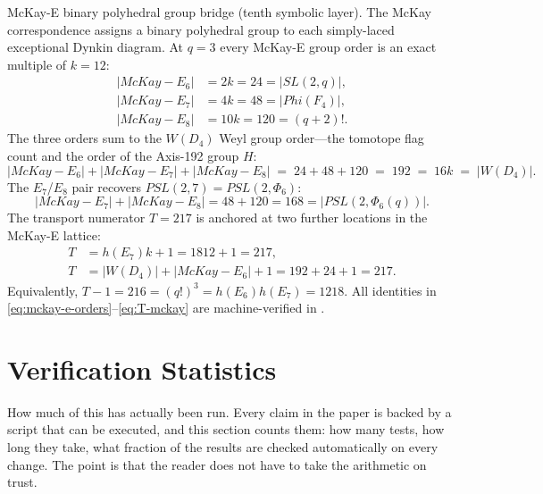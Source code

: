 \documentclass[12pt,a4paper]{article}
\def\mathrm#1{#1}%
\def\textbf#1{#1}%
\def\text#1{#1}%
\def\Phi#1{Phi#1}%
\def\cdot{ }%
\theoremstyle{definition}
\begin{document}
\medskip
\noindent\textbf{McKay-E binary polyhedral group bridge (tenth symbolic layer).}\quad
The McKay correspondence assigns a binary polyhedral group to each simply-laced
exceptional Dynkin diagram.  At $q=3$ every McKay-E group order is an exact
multiple of $k=12$:
\begin{equation}
\begin{aligned}
|\text{McKay-}E_6| &= 2k = 24 = |SL(2,q)|,\\
|\text{McKay-}E_7| &= 4k = 48 = |\Phi(F_4)|,\\
|\text{McKay-}E_8| &= 10k = 120 = (q{+}2)!.
\end{aligned}
\label{eq:mckay-e-orders}
\end{equation}
The three orders sum to the $W(D_4)$ Weyl group order---the tomotope flag
count and the order of the Axis-192 group $H$:
\begin{equation}
|\text{McKay-}E_6|+|\text{McKay-}E_7|+|\text{McKay-}E_8|
  \;=\; 24+48+120 \;=\; 192 \;=\; 16k \;=\; |W(D_4)|.
\label{eq:mckay-e-sum}
\end{equation}
The $E_7$/$E_8$ pair recovers $\mathrm{PSL}(2,7) = \mathrm{PSL}(2,\Phi_6)$:
\begin{equation}
|\text{McKay-}E_7|+|\text{McKay-}E_8| = 48+120 = 168 = |\mathrm{PSL}(2,\Phi_6(q))|.
\label{eq:mckay-psl}
\end{equation}
The transport numerator $T=217$ is anchored at two further locations in the
McKay-E lattice:
\begin{equation}
\begin{aligned}
T &= h(E_7)\cdot k + 1 = 18\cdot 12 + 1 = 217,\\
T &= |W(D_4)| + |\text{McKay-}E_6| + 1 = 192+24+1 = 217.
\end{aligned}
\label{eq:T-mckay}
\end{equation}
Equivalently, $T-1 = 216 = (q!)^3 = h(E_6)\cdot h(E_7) = 12\cdot 18$.
All identities in \eqref{eq:mckay-e-orders}--\eqref{eq:T-mckay} are
machine-verified in
.


\section{Verification Statistics}

\begin{plainbox}
How much of this has actually been run. Every claim in the paper is backed by a
script that can be executed, and this section counts them: how many tests, how long they
take, what fraction of the results are checked automatically on every change. The point is
that the reader does not have to take the arithmetic on trust.
\end{plainbox}
\end{document}
